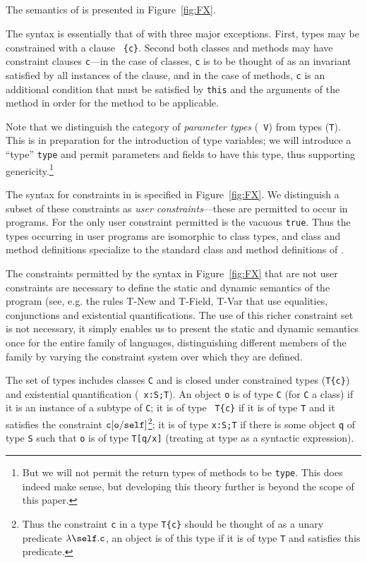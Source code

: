 \subsection{\FXZ}
The semantics of \FXZ{} is presented in Figure~\ref{fig:FX}. 

The syntax is essentially that of \FJ{} with three major
exceptions. First, types may be constrained with a clause {\tt
\{c\}}. Second both classes and methods may have constraint clauses
{\tt c}---in the case of classes, {\tt c} is to be thought of as an
invariant satisfied by all instances of the clause, and in the case of
methods, {\tt c} is an additional condition that must be satisfied by
{\tt this} and the arguments of the method in order for the method to
be applicable. 

Note that we distinguish the category of {\em parameter types} ({\tt
V}) from types ({\tt T}). This is in preparation for the introduction
of type variables; we will introduce a ``type'' {\tt type} and permit
parameters and fields to have this type, thus supporting
genericity.\footnote{But we will not permit the return types of
methods to be {\tt type}. This does indeed make sense, but developing
this theory further is beyond the scope of this paper.}

The syntax for constraints in \FXZ{} is specified in
Figure~\ref{fig:FX}. We distinguish a subset of these constraints as
{\em user constraints}---these are permitted to occur in
programs. For \FXZ{} the only user constraint permitted is the vacuous
{\tt true}. Thus the types occurring in user programs are isomorphic
to class types, and class and method definitions specialize to the
standard class and method definitions of \FJ{}. 

The constraints permitted by the syntax in Figure~\ref{fig:FX} that
are not user constraints are necessary to define the static and
dynamic semantics of the program (see, e.g.{} the rules {\sc T-New}
and {\sc T-Field}, {\sc T-Var} that use equalities, conjunctions and
existential quantifications. The use of this richer constraint set is
not necessary, it simply enables us to present the static and dynamic
semantics once for the entire family of \FX{} languages,
distinguishing different members of the family by varying the
constraint system over which they are defined.

The set of types includes classes {\tt C} and is closed under
constrained types ({\tt T\{c\}}) and existential quantification ({\tt
x:S;T}). An object {\tt o} is of type {\tt C} (for {\tt C} a class)
if it is an instance of a subtype of {\tt C}; it is of type {\tt
T\{c\}} if it is of type {\tt T} and it satisfies the constraint $\tt
c[o/self]$\footnote{Thus the constraint {\tt c} in a type {\tt T\{c\}}
should be thought of as a unary predicate $\lambda\self.{\tt c}$, an
object is of this type if it is of type {\tt T} and satisfies this
predicate.}; it is of type {\tt x:S;T} if there is some object {\tt q}
of type {\tt S} such that {\tt o} is of type {\tt T[q/x]} (treating at
type as a syntactic expression).


